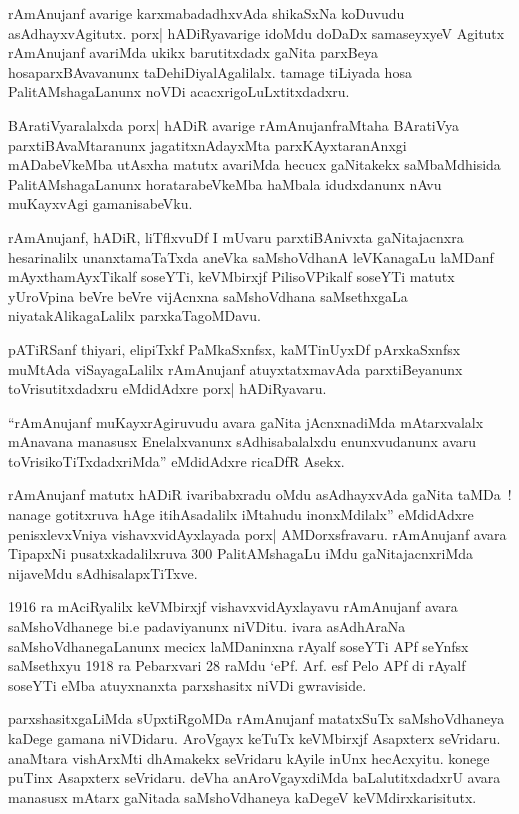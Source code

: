 rAmAnujanf avarige karxmabadadhxvAda shikaSxNa koDuvudu asAdhayxvAgitutx.
porx| hADiRyavarige idoMdu doDaDx samaseyxyeV Agitutx rAmAnujanf avariMda ukikx barutitxdadx gaNita parxBeya hosaparxBAvavanunx taDehiDiyalAgalilalx. tamage tiLiyada hosa PalitAMshagaLanunx noVDi acacxrigoLuLxtitxdadxru.

BAratiVyaralalxda porx| hADiR avarige rAmAnujanfraMtaha BAratiVya parxtiBA\-vaMtaranunx jagatitxnAdayxMta parxKAyxtaranAnxgi mADabeVkeMba utAsxha matutx avariMda hecucx gaNitakekx saMbaMdhisida PalitAMshagaLanunx horatarabeVkeMba haMbala idudxdanunx nAvu muKayxvAgi gamanisabeVku.

rAmAnujanf, hADiR, liTflxvuDf I mUvaru parxtiBAnivxta gaNitajacnxra hesarinalilx unanxtamaTaTxda aneVka saMshoVdhanA leVKanagaLu laMDanf mAyxthamAyxTikalf soseYTi, keVMbirxjf PilisoVPikalf soseYTi matutx yUroVpina beVre beVre vijAcnxna saMshoV\-dhana saMsethxgaLa niyatakAlikagaLalilx parxkaTagoMDavu.

pATiRSanf thiyari, elipiTxkf PaMkaSxnfsx, kaMTinUyxDf pArxkaSxnfsx muMtAda viSayagaLalilx rAmAnujanf atuyxtatxmavAda parxtiBeyanunx toVrisutitxdadxru eMdidAdxre porx| hADiRyavaru.

``rAmAnujanf muKayxrAgiruvudu avara gaNita jAcnxnadiMda mAtarxvalalx mAna\-vana manasusx Enelalxvanunx sAdhisabalalxdu enunxvudanunx avaru toVrisikoTiTxdadxriMda'' eMdidAdxre ricaDfR Asekx.

rAmAnujanf matutx hADiR ivaribabxradu oMdu asAdhayxvAda gaNita taMDa~! nanage gotitxruva hAge itihAsadalilx iMtahudu inonxMdilalx'' eMdidAdxre penisxlevxVniya vishavxvidAyxlayada porx| AMDorxsfravaru. rAmAnujanf avara TipapxNi pusatxkadalilxruva {\rm 300} PalitAMshagaLu iMdu gaNitajacnxriMda nijaveMdu sAdhisalapxTiTxve.

{\rm 1916} ra mAciRyalilx keVMbirxjf vishavxvidAyxlayavu rAmAnujanf avara saMshoVdha\-nege bi.e padaviyanunx niVDitu. ivara asAdhAraNa saMshoVdhanegaLanunx mecicx laMDa\-ninxna rAyalf soseYTi APf seYnfsx saMsethxyu {\rm 1918} ra Pebarxvari {\rm 28} raMdu `ePf. Arf. esf Pelo APf di rAyalf soseYTi eMba atuyxnanxta parxshasitx niVDi gwraviside.

parxshasitxgaLiMda sUpxtiRgoMDa rAmAnujanf matatxSuTx saMshoVdhaneya kaDege gamana niVDidaru. AroVgayx keTuTx keVMbirxjf Asapxterx seVridaru. anaMtara vishArxMti dhAmakekx seVridaru kAyile inUnx hecAcxyitu. konege puTinx Asapxterx seVridaru. deVha anAroVgayx\-diMda baLalutitxdadxrU avara manasusx mAtarx gaNitada saMshoVdhaneya kaDegeV keVMdirx\-karisitutx.

